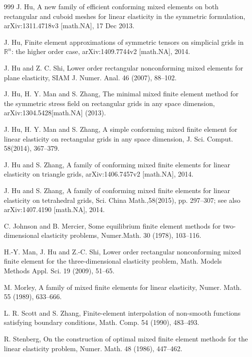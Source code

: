 \documentclass{amsart}
\numberwithin{table}{section}
\numberwithin{figure}{section}
\begin{document}
\begin{thebibliography}{999}
J. Hu,  A new family of efficient  conforming mixed
elements on both rectangular and cuboid meshes for linear  elasticity in the symmetric formulation,
arXiv:1311.4718v3 [math.NA], 17 Dec 2013.


J. Hu, Finite element  approximations of  symmetric tensors  on simplicial grids in $\mathbb{R}^n$: the higher order case, arXiv:1409.7744v2 [math.NA], 2014.


  J. Hu and Z. C. Shi,
     Lower order rectangular nonconforming mixed elements for plane elasticity,
     SIAM J. Numer. Anal.  46 (2007),   88--102.

 J. Hu, H. Y. Man and S. Zhang,
    The minimal mixed finite element method for the symmetric stress
   field on rectangular  grids in any space dimension, arXiv:1304.5428[math.NA] (2013).

J. Hu, H. Y. Man and S. Zhang,
A simple conforming mixed finite element for linear
elasticity on rectangular grids in any space dimension,
   J. Sci. Comput. 58(2014), 367--379.

 J. Hu and S. Zhang, A family of conforming mixed finite elements for linear elasticity on
 triangle grids, arXiv:1406.7457v2 [math.NA], 2014.

  J. Hu and S. Zhang, A family of conforming mixed finite elements for linear elasticity on
  tetrahedral grids, Sci. China  Math.,58(2015), pp. 297--307; see also arXiv:1407.4190 [math.NA], 2014.



 C. Johnson and B. Mercier,
    Some equilibrium finite element methods for two-dimensional elasticity
     problems, Numer.Math. 30 (1978),  103--116.

 H.-Y. Man, J. Hu and Z.-C. Shi,
   Lower order rectangular nonconforming mixed finite element for
     the three-dimensional elasticity problem,
   Math. Models Methods Appl. Sci. 19 (2009),  51--65.

 M. Morley, A family of mixed finite elements
   for linear elasticity, Numer. Math. 55 (1989),  633--666.

   L. R. Scott and S. Zhang,
     Finite-element interpolation of
   non-smooth functions satisfying boundary conditions, Math. Comp.
     54  (1990), 483--493.

     R. Stenberg, On the construction of optimal mixed finite
     element methods for the linear elasticity
     problem, Numer. Math. 48 (1986),   447--462.


\end{thebibliography}
\end{document}
